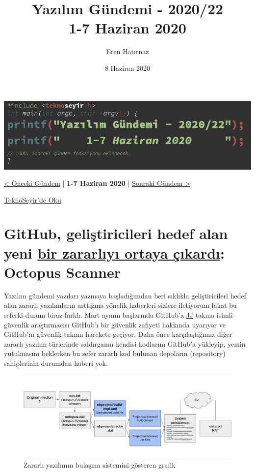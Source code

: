 \documentclass[11pt]{article}
\author{Eren Hatırnaz}
\date{8 Haziran 2020}
\title{Yazılım Gündemi - 2020/22\\\medskip
\large 1-7 Haziran 2020}
\begin{document}
\maketitle
\tableofcontents \clearpage\shorthandoff{=}

\begin{center}
\includegraphics[width=.9\linewidth]{gorseller/yazilim-gundemi-banner.png}
\end{center}

\begin{center}
\href{../21/yazilim-gundemi-2020-21.pdf}{< Önceki Gündem} | \textbf{1-7 Haziran 2020} | \href{../23/yazilim-gundemi-2020-23.pdf}{Sonraki Gündem >}

\href{https://teknoseyir.com/blog/yazilim-gundemi-2020-22}{TeknoSeyir'de Oku}
\end{center}

\section{GitHub, geliştiricileri hedef alan yeni \href{https://securitylab.github.com/research/octopus-scanner-malware-open-source-supply-chain}{bir zararlıyı ortaya çıkardı}: Octopus Scanner}
\label{sec:orga90ca15}
Yazılım gündemi yazıları yazmaya başladığımdan beri sıklıkla geliştiricileri
hedef alan zararlı yazılımların arttığına yönelik haberleri sizlere iletiyorum
fakat bu seferki durum biraz farklı. Mart ayının başlarında GitHub'a \href{https://securitylab.github.com/research/octopus-scanner-malware-open-source-supply-chain}{JJ} takma
isimli güvenlik araştırmacısı GitHub'ı bir güvenlik zafiyeti hakkında uyarıyor
ve GitHub'ın güvenlik takımı harekete geçiyor. Daha önce karşılaştığımız diğer
zararlı yazılım türlerinde saldırganın kendisi kodlarını GitHub'a yükleyip,
yemin yutulmasını beklerken bu sefer zararlı kod bulunan depoların
(repository) sahiplerinin durumdan haberi yok.

\begin{figure}[htbp]
\centering
\includegraphics[width=.9\linewidth]{gorseller/github-octopus-scanner.png}
\caption{Zararlı yazılımın bulaşma sistemini gösteren grafik}
\end{figure}
\end{document}
